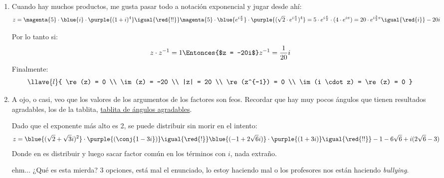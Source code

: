 \begin{enumerate}[label=\roman*)]

  \item  Cuando hay muchos productos, me gusta pasar todo a notación exponencial y jugar desde ahí:
        $$
          z =
          \magenta{5} \cdot \blue{i} \cdot \purple{(1+i)^4}
          \igual{\red{!!}}
          \magenta{5} \cdot \blue{e^{i\frac{\pi}{2}}} \cdot \purple{(\sqrt{2} \cdot e^{i \frac{\pi}{4}})^4}
          =
          5 \cdot e^{i\frac{\pi}{2}} \cdot (4 \cdot  e^{i \pi})
          =
          20 \cdot e^{i \frac{3}{2}\pi}
          \igual{\red{i}}
          -20i
        $$

        Por lo tanto si:
        $$
          z \cdot z^{-1} = 1
          \Entonces{$z = -20i$}
          z^{-1} = \frac{1}{20}i
        $$
        Finalmente:
        $$
          \llave{l}{
            \re(z) = 0      \\
            \im(z) = -20    \\
            |z| = 20        \\
            \re(z^{-1}) = 0 \\
            \im(i \cdot z) = \re(z) = 0
          }
        $$

  \item
        A ojo, o casi, veo que los valores de los argumentos de los factores son feos. Recordar que hay muy pocos ángulos que tienen resultados
        agradables, los de la tablita, \hyperlink{teoria-6:tablita}{tablita de ángulos agradables}.

        Dado que el exponente más alto es 2, se puede distribuir sin morir en el intento:
        $$
          z =
          \blue{(\sqrt{2} + \sqrt{3} i)^2} \cdot \purple{(\conj{1 - 3i})}
          \igual{\red{!}}
          \blue{(-1 + 2\sqrt{6}i)} \cdot \purple{(1+ 3i)}
          \igual{\red{!!}}
          -1 - 6\sqrt{6} + i(2\sqrt{6} - 3)
        $$
        Donde en \red{!!} es distribuir y luego sacar factor común en los términos con $i$, nada extraño.\par

        \bigskip

        ehm... ¿Qué es esta mierda? 3 opciones, está mal el enunciado, lo estoy haciendo mal o los profesores nos están haciendo \textit{bullying}.


\end{enumerate}
